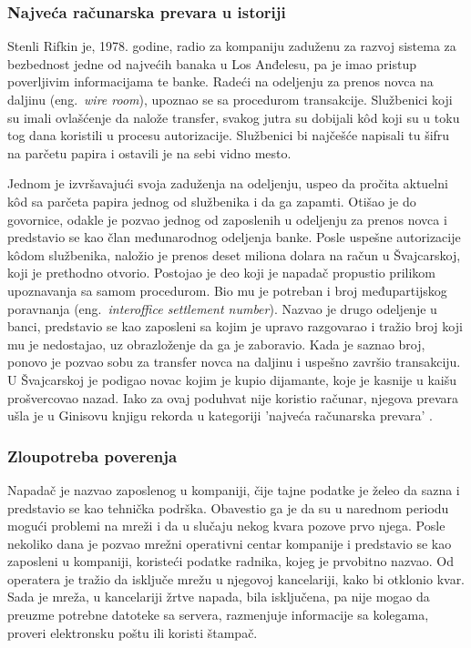 \documentclass[a4paper]{article}
\begin{document}
\subsubsection{Najveća računarska prevara u istoriji}
\label{hack_za_ginisa}

Stenli Rifkin je, 1978. godine, radio za kompaniju zaduženu za razvoj sistema za bezbednost jedne od najvećih banaka u Los Anđelesu, pa je imao pristup poverljivim informacijama te banke. Radeći na odeljenju za prenos novca na daljinu (eng.~{\em wire room}), upoznao se sa procedurom transakcije. Službenici koji su imali ovlašćenje da nalože transfer, svakog jutra su dobijali kôd koji su u toku tog dana koristili u procesu autorizacije. Službenici bi najčešće napisali tu šifru na parčetu papira i ostavili je na sebi vidno mesto. 

Jednom je izvršavajući svoja zaduženja na odeljenju, uspeo da pročita aktuelni kôd sa parčeta papira jednog od službenika i da ga zapamti. Otišao je do govornice, odakle je pozvao jednog od zaposlenih u odeljenju za prenos novca i predstavio se kao član međunarodnog odeljenja banke. Posle uspešne autorizacije kôdom službenika, naložio je prenos deset miliona dolara na račun u Švajcarskoj, koji je prethodno otvorio. Postojao je deo koji je napadač propustio prilikom upoznavanja sa samom procedurom. Bio mu je potreban i broj međupartijskog poravnanja (eng.~{\em interoffice settlement number}). Nazvao je drugo odeljenje u banci, predstavio se kao zaposleni sa kojim je upravo razgovarao i tražio broj koji mu je nedostajao, uz obrazloženje da ga je zaboravio. Kada je saznao broj, ponovo je pozvao sobu za transfer novca na daljinu i uspešno završio transakciju. U Švajcarskoj je podigao novac kojim je kupio dijamante, koje je kasnije u kaišu prošvercovao nazad. Iako za ovaj poduhvat nije koristio računar, njegova prevara ušla je u Ginisovu knjigu rekorda u kategoriji 'najveća računarska prevara' \cite{deception}.

\subsubsection{Zloupotreba poverenja}
\label{pomoc_neprijatelja}

Napadač je nazvao zaposlenog u kompaniji, čije tajne podatke je želeo da sazna i predstavio se kao tehnička podrška. Obavestio ga je da su u narednom periodu mogući problemi na mreži i da u slučaju nekog kvara pozove prvo njega. Posle nekoliko dana je pozvao mrežni operativni centar kompanije i predstavio se kao zaposleni u kompaniji, koristeći podatke radnika, kojeg je prvobitno nazvao. Od operatera je tražio da isključe mrežu u njegovoj kancelariji, kako bi otklonio kvar. Sada je mreža, u kancelariji žrtve napada, bila isključena, pa nije mogao da preuzme potrebne datoteke sa servera, razmenjuje informacije sa kolegama, proveri elektronsku poštu ili koristi štampač.
\end{document}
